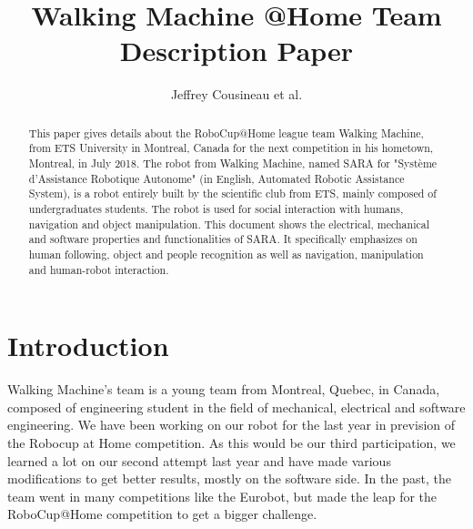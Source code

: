 \documentclass[runningheads,a4paper]{llncs}
\begin{document}
\title{Walking Machine @Home \newline {} Team Description Paper}

\author{Jeffrey Cousineau et al.}
\maketitle



\begin{abstract}

This paper gives details about the RoboCup@Home league team Walking Machine, from ETS University in Montreal, Canada for the next competition in his hometown, Montreal, in July 2018. The robot from Walking Machine, named SARA for "Système d’Assistance Robotique Autonome" (in English, Automated Robotic Assistance System), is a robot entirely built by the scientific club from ETS, mainly composed of undergraduates students. The robot is used for social interaction with humans, navigation and object manipulation. This document shows the electrical, mechanical and software properties and functionalities of SARA. It specifically emphasizes on human following, object and people recognition as well as navigation, manipulation and human-robot interaction.

\end{abstract}


\section{Introduction}
\tab Walking Machine’s team is a young team from Montreal, Quebec, in Canada, composed of engineering student in the field of mechanical, electrical and software engineering. We have been working on our robot for the last year in prevision of the Robocup at Home competition. As this would be our third participation, we learned a lot on our second attempt last year and have made various modifications to get better results, mostly on the software side. In the past, the team went in many competitions like the Eurobot, but made the leap for the RoboCup@Home competition to get a bigger challenge. \\
\end{document}
